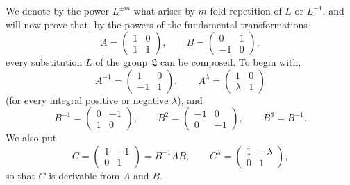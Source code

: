 \documentclass[11pt]{article}
\begin{document}
We denote by the power $L^{\pm m}$ what arises by $m$-fold repetition of $L$ or $L^{-1}$, and will now prove that, by the powers of the fundamental transformations
\begin{equation}
A=\begin{pmatrix}1&0\\1&1\end{pmatrix},
\qquad
B=\begin{pmatrix}0&1\\-1&0\end{pmatrix}, \tag{2}
\end{equation}
every substitution $L$ of the group $\mathfrak L$ can be composed. To begin with,
\begin{equation}
A^{-1}=\begin{pmatrix}1&0\\-1&1\end{pmatrix},
\qquad
A^\lambda=\begin{pmatrix}1&0\\ \lambda&1\end{pmatrix} \tag{3}
\end{equation}
(for every integral positive or negative $\lambda$), and
\begin{equation}
B^{-1}=\begin{pmatrix}0&-1\\1&0\end{pmatrix},
\qquad
B^2=\begin{pmatrix}-1&0\\0&-1\end{pmatrix},
\qquad
B^3=B^{-1}. \tag{4}
\end{equation}
We also put
\begin{equation}
C=\begin{pmatrix}1&-1\\0&1\end{pmatrix}=B^{-1}AB,
\qquad
C^\lambda=\begin{pmatrix}1&-\lambda\\0&1\end{pmatrix}, \tag{5}
\end{equation}
so that $C$ is derivable from $A$ and $B$.
\end{document}

